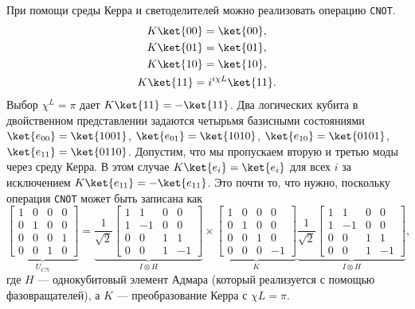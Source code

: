 При помощи среды Керра и светоделителей можно реализовать операцию
\verb|CNOT|.
\begin{gather}
  K\ket{00} = \ket{00}, \\
  K\ket{01} = \ket{01}, \\
  K\ket{10} = \ket{10}, \\
  K\ket{11} = i^{i\chi L}\ket{11}.
\end{gather}
Выбор $\chi^L=\pi$ дает $K\ket{11}=-\ket{11}$. Два логических кубита в
двойственном представлении задаются четырьмя базисными состояниями
$\ket{e_{00}} = \ket{1001}$, $\ket{e_{01}} = \ket{1010}$,
$\ket{e_{10}} = \ket{0101}$, $\ket{e_{11}} = \ket{0110}$. Допустим, что мы
пропускаем вторую и третью моды через среду Керра. В этом случае
$K\ket{e_i} = \ket{e_i}$ для всех $i$ за исключением
$K\ket{e_{11}} = -\ket{e_{11}}$. Это почти то, что нужно, поскольку операция
\verb|CNOT| может быть записана как
\begin{equation}
  \underbrace{\begin{bmatrix}
    1 & 0 & 0 & 0 \\
    0 & 1 & 0 & 0 \\
    0 & 0 & 0 & 1 \\
    0 & 0 & 1 & 0
  \end{bmatrix}}_{U_{CN}}
  = \underbrace{\frac{1}{\sqrt2}
  \begin{bmatrix}
    1 & 1 & 0 & 0 \\
    1 & -1 & 0 & 0 \\
    0 & 0 & 1 & 1 \\
    0 & 0 & 1 & -1
\end{bmatrix}}_{I \otimes H}
  \times
  \underbrace{\begin{bmatrix}
    1 & 0 & 0 & 0 \\
    0 & 1 & 0 & 0 \\
    0 & 0 & 1 & 0 \\
    0 & 0 & 0 & -1
  \end{bmatrix}}_{K}
  \underbrace{\frac{1}{\sqrt2}
  \begin{bmatrix}
    1 & 1 & 0 & 0 \\
    1 & -1 & 0 & 0 \\
    0 & 0 & 1 & 1 \\
    0 & 0 & 1 & -1
  \end{bmatrix}}_{I \otimes H},
\end{equation}
где $H$ --- однокубитовый элемент Адмара (который реализуется с помощью
фазовращателей), а $K$ --- преобразование Керра с $\chi L = \pi$.



